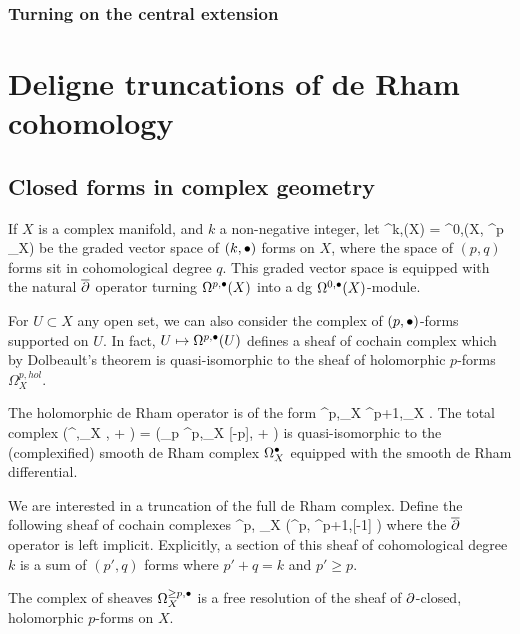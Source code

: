 \documentclass[11pt]{amsart}
\begin{document}
\subsubsection{Turning on the central extension}


\section{Deligne truncations of de Rham cohomology}

\subsection{Closed forms in complex geometry}

If $X$ is a complex manifold, and $k$ a non-negative integer, let 
\beqn
\Omega^{k,\bu}(X) = \Omega^{0,\bu}(X, \wedge^p \T_X)
\eeqn
be the graded vector space of $(k,\bullet)$ forms on $X$, where the space of $(p,q)$ forms sit in cohomological degree $q$.
This graded vector space is equipped with the natural $\overline{\partial}$ operator turning $\Omega^{p,\bullet}(X)$ into a dg $\Omega^{0,\bullet}(X)$-module.

For $U \subset X$ any open set, we can also consider the complex of $(p,\bullet)$-forms supported on $U$.
In fact, $U \mapsto \Omega^{p,\bullet}(U)$ defines a sheaf of cochain complex which by Dolbeault's theorem is quasi-isomorphic to the sheaf of holomorphic $p$-forms $\Omega^{p,hol}_X$.

The holomorphic de Rham operator is of the form
\beqn
\del \colon \Omega^{p,\bu}_X \to \Omega^{p+1,\bu}_X .
\eeqn
The total complex
\beqn
\left(\Omega^{\bu,\bu}_X , \dbar + \del\right) = \left(\oplus_{p} \Omega^{p,\bu}_X [-p], \dbar + \del \right) 
\eeqn
is quasi-isomorphic to the (complexified) smooth de Rham complex $\Omega^\bullet_X$ equipped with the smooth de Rham differential.

We are interested in a truncation of the full de Rham complex.
Define the following sheaf of cochain complexes 
\beqn
\Omega^{\geq p, \bu}_X  \left(\Omega^{p,\bu} \xto{\del} \Omega^{p+1,\bu}[-1] \xto{\del} \cdots \right) 
\eeqn
where the $\overline{\partial}$ operator is left implicit.
Explicitly, a section of this sheaf of cohomological degree $k$ is a sum of $(p',q)$ forms where $p' + q = k$ and $p' \geq p$.

\begin{prop}
The complex of sheaves $\Omega^{\geq p, \bullet}_X$ is a free resolution of the sheaf of $\partial$-closed, holomorphic $p$-forms on $X$.
\end{prop}
\end{document}
